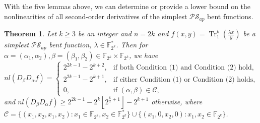 \documentclass{article}
\newcommand{\F}{\mathbb{F}}
\newcommand{\0}{\textbf{0}}
\newcommand{\1}{\textbf{1}}
\newcommand{\TRACE}{\operatorname{Tr}_1^k}
\theoremstyle{plain}
\newtheorem{theorem}{Theorem}
\begin{document}
    With the five lemmas above, we can determine or provide a lower bound on the nonlinearities of all second-order derivatives of the simplest $\mathcal{PS}_{ap}$ bent functions.
    \begin{theorem}\label{thm:nl_DaDbf}
        Let $k\ge 3$ be an integer and $n=2k$ and $f(x,y)=\TRACE\left(\frac{\lambda x}{y}\right)$ be a simplest $\mathcal{PS}_{ap}$ bent function, $\lambda\in\F_{2^k}^*$.
        Then for $\alpha=(\alpha_1,\alpha_2),\beta=(\beta_1,\beta_2)\in\F_{2^k}\times\F_{2^k}$, we have 
        \begin{equation}\label{res:nontrivil_nl}
            nl(D_{\beta}D_{\alpha}f)=\begin{cases}
                2^{2k-1}-2^{k+2},&\text{if both Condition (1) and Condition (2) hold},\\
                2^{2k-1}-2^{k+1},&\text{if either Condition (1) or Condition (2) holds},\\
                0,&\text{if }(\alpha,\beta)\in \mathcal{C},%
            \end{cases}
        \end{equation}
        and $nl(D_{\beta}D_{\alpha}f)\ge 2^{2k-1}-2^k\left\lfloor 2^{\frac{k}{2}+1}\right\rfloor-2^{k+1}$ otherwise,
        where $\mathcal{C}=\{(x_1,x_2,x_1,x_2):x_1\in\F_{2^k},x_2\in\F_{2^k}^*\}\cup\{(x_1,0,x_2,0):x_1,x_2\in\F_{2^k}\}$.
    \end{theorem}
\end{document}
